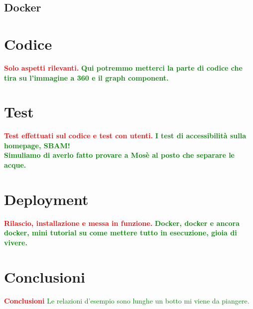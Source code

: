 \documentclass{article}
\begin{document}
\subsection{Docker}

\section{Codice}
\textcolor{red}{\textbf{Solo aspetti rilevanti.}}
\textcolor{green}{\textbf{Qui potremmo metterci la parte di codice che tira su l'immagine a 360 e il graph component.}}

\section{Test}
\textcolor{red}{\textbf{Test effettuati sul codice e test con utenti.}}
\textcolor{green}{\textbf{I test di accessibilità sulla homepage, SBAM!\\Simuliamo di averlo fatto provare a Mosè al posto che separare le acque.}}

\section{Deployment}
\textcolor{red}{\textbf{Rilascio, installazione e messa in funzione.}}
\textcolor{green}{\textbf{Docker, docker e ancora docker, mini tutorial su come mettere tutto in esecuzione, gioia di vivere.}}

\section{Conclusioni}
\textcolor{red}{\textbf{Conclusioni}}
\textcolor{green}{Le relazioni d'esempio sono lunghe un botto mi viene da piangere.}



\end{document}

